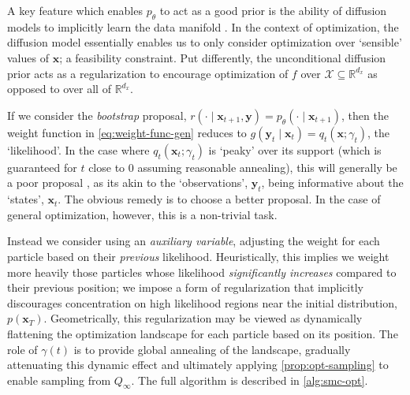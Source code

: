 \begin{remark}
    A key feature which enables $p_\theta$ to act as a good prior is the ability of diffusion models
    to implicitly learn the data manifold \parencite{debortoliDiffusionSchrOdinger2021,pidstrigachScoreBasedGenerativeModels2022,wenliangScorebasedGenerativeModels2023}.
    In the context of optimization, the diffusion model essentially enables us to only consider
    optimization over `sensible' values of $\mathbf{x}$; a feasibility constraint. Put differently,
    the unconditional diffusion prior acts as a regularization to encourage optimization of $f$ over
    $\mathcal{X} \subseteq \mathbb{R}^{d_x}$ as opposed to over all of $\mathbb{R}^{d_x}$.
\end{remark}

If we consider the \emph{bootstrap} proposal,
$r(\cdot \mid \mathbf{x}_{t+1}, \mathbf{y}) = p_\theta(\cdot \mid \mathbf{x}_{t+1})$, then the
weight function in \ref{eq:weight-func-gen} reduces to
$g(\mathbf{y}_t \mid \mathbf{x}_t) = q_t(\mathbf{x}; \gamma_t)$, the `likelihood'. In the case where
$q_t(\mathbf{x}_t; \gamma_t)$ is `peaky' over its support (which is guaranteed for $t$ close to 0
assuming reasonable annealing), this will generally be a poor proposal
\parencite{chopinIntroductionSequentialMonte2020}, as its akin to the `observations',
$\mathbf{y}_t$, being informative about the `states', $\mathbf{x}_t$. The obvious remedy is to
choose a better proposal. In the case of general optimization, however, this is a non-trivial task.

Instead we consider using an \emph{auxiliary variable}, adjusting the weight
for each particle based on their \emph{previous} likelihood. Heuristically, this implies we weight
more heavily those particles whose likelihood \emph{significantly increases} compared to their
previous position; we impose a form of regularization that implicitly discourages concentration on
high likelihood regions near the initial distribution, $p(\mathbf{x}_T)$. Geometrically, this
regularization may be viewed as dynamically flattening the optimization landscape for each particle
based on its position. The role of $\gamma(t)$ is to provide global annealing of the landscape,
gradually attenuating this dynamic effect and ultimately applying \ref{prop:opt-sampling} to
enable sampling from $Q_\infty$. The full algorithm is described in \ref{alg:smc-opt}.


